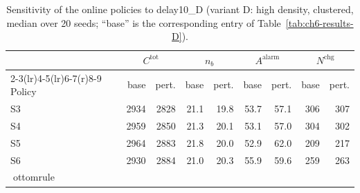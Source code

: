 \begin{table}[htbp]
\centering
\caption{Sensitivity of the online policies to delay10_D (variant D: high density, clustered,
median over 20 seeds; ``base'' is the corresponding entry of
Table~\ref{tab:ch6-results-D}).}
\label{tab:ch6-sens-D-delay10}
\footnotesize
\begin{tabular}{@{}l rr rr rr rr@{}}
\toprule
& \multicolumn{2}{c}{$C^{\mathrm{tot}}$} & \multicolumn{2}{c}{$n_b$}
  & \multicolumn{2}{c}{$A^{\mathrm{alarm}}$} & \multicolumn{2}{c}{$N^{\mathrm{chg}}$} \\
\cmidrule(r){2-3}\cmidrule(lr){4-5}\cmidrule(lr){6-7}\cmidrule(r){8-9}
Policy & base & pert. & base & pert. & base & pert. & base & pert. \\
\midrule

S3 & 2934 & 2828 & 21.1 & 19.8 & 53.7 & 57.1 & 306 & 307 \\
S4 & 2959 & 2850 & 21.3 & 20.1 & 53.1 & 57.0 & 304 & 302 \\
S5 & 2964 & 2883 & 21.8 & 20.0 & 52.9 & 62.0 & 209 & 217 \\
S6 & 2930 & 2884 & 21.0 & 20.3 & 55.9 & 59.6 & 259 & 263 \\
ottomrule
\end{tabular}
\end{table}
